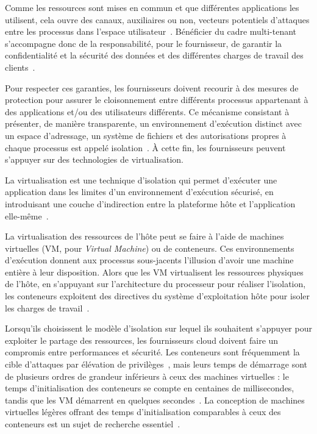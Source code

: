 Comme les ressources sont mises en commun et que différentes applications les utilisent, cela ouvre des canaux, auxiliaires ou non, vecteurs potentiels d'attaques entre les processus dans l'espace utilisateur~\cite{pedersen2017trash, wu2018side}. Bénéficier du cadre multi-tenant s'accompagne donc de la responsabilité, pour le fournisseur, de garantir la confidentialité et la sécurité des données et des différentes charges de travail des clients~\cite{vaqueroLockingSkySurvey2011}.

Pour respecter ces garanties, les fournisseurs doivent recourir à des mesures de protection pour assurer le cloisonnement entre différents processus appartenant à des applications et/ou des utilisateurs différents. Ce mécanisme consistant à présenter, de manière transparente, un environnement d'exécution distinct avec un espace d'adressage, un système de fichiers et des autorisations propres à chaque processus est appelé isolation~\cite{fehlingCloudComputingPatterns2014}. À cette fin, les fournisseurs peuvent s'appuyer sur des technologies de virtualisation.

La virtualisation est une technique d'isolation qui permet d'exécuter une application dans les limites d'un environnement d'exécution sécurisé, en introduisant une couche d'indirection entre la plateforme hôte et l'application elle-même~\cite{singhviAtollScalableLowLatency2021}.

La virtualisation des ressources de l'hôte peut se faire à l'aide de machines virtuelles (\gls{VM}, pour \textit{Virtual Machine}) ou de conteneurs. Ces environnements d'exécution donnent aux processus sous-jacents l'illusion d'avoir une machine entière à leur disposition. Alors que les VM virtualisent les ressources physiques de l'hôte, en s'appuyant sur l'architecture du processeur pour réaliser l'isolation, les conteneurs exploitent des directives du système d'exploitation hôte pour isoler les charges de travail~\cite{mancoMyVMLighter2017}.

Lorsqu'ils choisissent le modèle d'isolation sur lequel ils souhaitent s'appuyer pour exploiter le partage des ressources, les fournisseurs cloud doivent faire un compromis entre performances et sécurité. Les conteneurs sont fréquemment la cible d'attaques par élévation de privilèges~\cite{zomer2022containers, redhat2019containers}, mais leurs temps de démarrage sont de plusieurs ordres de grandeur inférieurs à ceux des machines virtuelles : le temps d'initialisation des conteneurs se compte en centaines de millisecondes, tandis que les VM démarrent en quelques secondes~\cite{mancoMyVMLighter2017}. La conception de machines virtuelles légères offrant des temps d'initialisation comparables à ceux des conteneurs est un sujet de recherche essentiel~\cite{agacheFirecrackerLightweightVirtualization, Anjali2020BlendingCA}.

